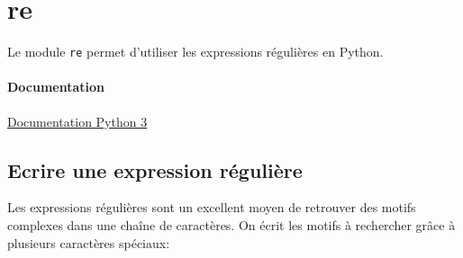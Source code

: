 \documentclass[a4paper, 10pt]{article}
\newcommand{\code}[1]{{\small\texttt{#1}}}
\begin{document}
\section{re}
Le module \code{re} permet d'utiliser les expressions régulières en Python.
\paragraph{Documentation} \href{https://docs.python.org/fr/3/library/re.html}{Documentation Python 3}

\subsection{Ecrire une expression régulière}
Les expressions régulières sont un excellent moyen de retrouver des motifs complexes dans une chaîne de caractères. On écrit les motifs à rechercher grâce à plusieurs caractères spéciaux:
\end{document}
